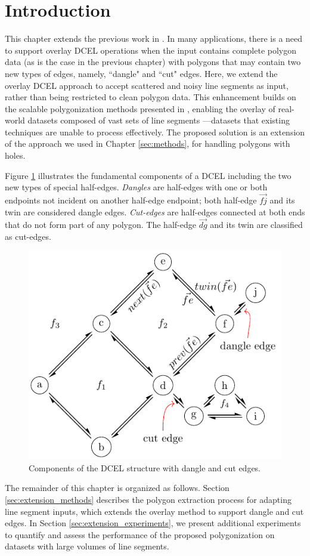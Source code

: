 \section{Introduction} %

This chapter extends the previous work in \cite{calderon_scalable_2023}. In many applications, there is a need to support overlay DCEL operations when the input contains complete polygon data (as is the case in the previous chapter) with polygons that may contain two new types of edges, namely, ``dangle" and ``cut" edges. Here, we extend the overlay DCEL approach to accept scattered and noisy line segments as input, rather than being restricted to clean polygon data. This enhancement builds on the scalable polygonization methods presented in \cite{abdelhafeez_ddcel_2023}, enabling the overlay of real-world datasets composed of vast sets of line segments —datasets that existing techniques are unable to process effectively. The proposed solution is an extension of the approach we used in Chapter \ref{sec:methods}, for handling polygons with holes.

Figure \ref{fig:extension_dcel_example} illustrates the fundamental components of a DCEL including the two new types of special half-edges. \textit{Dangles} are half-edges with one or both endpoints not incident on another half-edge endpoint; both half-edge $\overrightarrow{fj}$ and its twin are considered dangle edges. \textit{Cut-edges} are half-edges connected at both ends that do not form part of any polygon. The half-edge $\overrightarrow{dg}$ and its twin are classified as cut-edges.

\begin{figure}
    \centering
    \includegraphics[width=0.6\linewidth]{chapterExtension/dcel_example2}
    \caption{Components of the DCEL structure with dangle and cut edges.}\label{fig:extension_dcel_example}
\end{figure}

The remainder of this chapter is organized as follows. Section \ref{sec:extension_methods} describes the polygon extraction process for adapting line segment inputs, which extends the overlay method to support dangle and cut edges. In Section \ref{sec:extension_experiments}, we present additional experiments to quantify and assess the performance of the proposed polygonization on datasets with large volumes of line segments.
